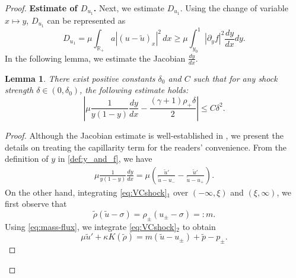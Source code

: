 \documentclass[11pt,reqno]{amsart}
\newtheorem{lemma}{Lemma}[section]
\numberwithin{equation}{section} %
\newcommand{\R}{\mathbb{R}}
\newcommand{\pa}{\partial}
\begin{document}
\begin{proof}
\vspace{2mm}
\noindent \textbf{Estimate of $D_{u_1}$.}
Next, we estimate $D_{u_1}$. Using the change of variable $x\mapsto y$, $D_{u_1}$ can be represented as
\begin{equation}\label{est:Du1}
D_{u_1}= \mu\int_{\R_+}a|(u-\tilde{u})_x|^2\,dx\ge\mu\int_{y_0}^1|\pa_yf|^2\frac{dy}{dx}dy.
\end{equation}
In the following lemma, we estimate the Jacobian $\frac{dy}{dx}$.

\begin{lemma} \label{lem:jacobian}
    There exist positive constants $\delta_0$ and $C$ such that for any shock strength $\delta \in (0, \delta_0)$, the following estimate holds:
    \begin{equation*}%
        \left| \mu \frac{1}{y(1-y)}\frac{dy}{dx} - \frac{(\gamma+1)\rho_+ \delta}{2} \right| \le C\delta^2.
    \end{equation*}
\end{lemma}

\begin{proof}
    Although the Jacobian estimate is well-established in \cite{KOW25}, we present the details on treating the capillarity term for the readers' convenience. From the definition of $y$ in \eqref{def:y_and_f}, we have
    \begin{align*}
        \mu\frac{1}{y(1-y)}\frac{d y}{d x} = \mu\left(\frac{\tilde{u}'}{\tilde{u} - u_-} - \frac{\tilde{u}'}{\tilde{u} - u_+}\right).
    \end{align*}
    On the other hand, integrating \eqref{eq:VCshock}$_1$ over $(-\infty,\xi)$ and $(\xi,\infty)$, we first observe that
    \begin{equation}\label{eq:mass-flux}
        \tilde{\rho}(\tilde{u} - \sigma) = \rho_\pm(u_\pm - \sigma) =: m.
    \end{equation}
    Using \eqref{eq:mass-flux}, we integrate \eqref{eq:VCshock}$_2$ to obtain
    \begin{equation}\label{eq:int-mom}
        \mu \tilde{u}' + \kappa K(\tilde{\rho}) = m(\tilde{u} - u_\pm) + \tilde{p} - p_\pm.
    \end{equation}
    

\end{proof}
\end{proof}
\end{document}
